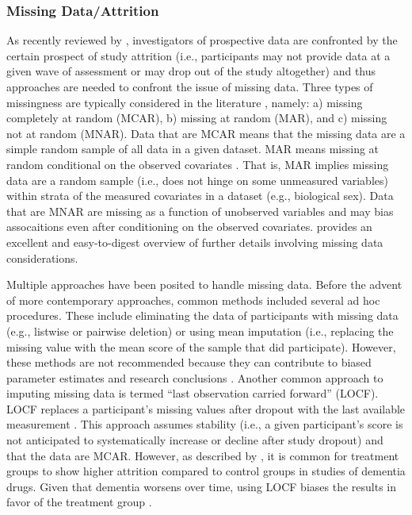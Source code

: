 \documentclass[
  number,
  preprint,
  3p,
  twocolumn]{elsarticle}
\begin{document}
\hypertarget{missing-dataattrition}{%
\subsubsection{Missing Data/Attrition}\label{missing-dataattrition}}

As recently reviewed by \citep{littlefield2022}, investigators of
prospective data are confronted by the certain prospect of study
attrition (i.e., participants may not provide data at a given wave of
assessment or may drop out of the study altogether) and thus approaches
are needed to confront the issue of missing data. Three types of
missingness are typically considered in the literature
\citep[see][]{little1989}, namely: a) missing completely at random
(MCAR), b) missing at random (MAR), and c) missing not at random (MNAR).
Data that are MCAR means that the missing data are a simple random
sample of all data in a given dataset. MAR means missing at random
conditional on the observed covariates \citep[see][]{graham2009}. That
is, MAR implies missing data are a random sample (i.e., does not hinge
on some unmeasured variables) within strata of the measured covariates
in a dataset (e.g., biological sex). Data that are MNAR are missing as a
function of unobserved variables and may bias assocaitions even after
conditioning on the observed covariates. \citep{graham2009} provides an
excellent and easy-to-digest overview of further details involving
missing data considerations.

Multiple approaches have been posited to handle missing data. Before the
advent of more contemporary approaches, common methods included several
ad hoc procedures. These include eliminating the data of participants
with missing data (e.g., listwise or pairwise deletion) or using mean
imputation (i.e., replacing the missing value with the mean score of the
sample that did participate). However, these methods are not recommended
because they can contribute to biased parameter estimates and research
conclusions \citep[see][]{graham2009}. Another common approach to
imputing missing data is termed ``last observation carried forward''
(LOCF). LOCF replaces a participant's missing values after dropout with
the last available measurement \citep{molnar2008}. This approach assumes
stability (i.e., a given participant's score is not anticipated to
systematically increase or decline after study dropout) and that the
data are MCAR. However, as described by \citep{molnar2008}, it is common
for treatment groups to show higher attrition compared to control groups
in studies of dementia drugs. Given that dementia worsens over time,
using LOCF biases the results in favor of the treatment group
\citep[see][for more details]{molnar2008}.
\end{document}
